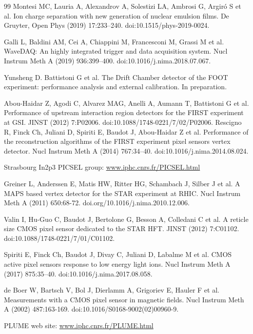 \documentclass[utf8]{frontiersFPHY} %
\begin{document}
\begin{thebibliography}{99}
 Montesi MC, Lauria A, Alexandrov A, Solestizi LA, Ambrosi G, Argir\'o S et al. Ion charge separation with new generation of nuclear emulsion films. De Gruyter, Open Phys (2019) 17:233–240. doi:10.1515/phys-2019-0024.

 Galli L, Baldini AM, Cei A, Chiappini M, Francesconi M, Grassi M et al. WaveDAQ: An highly integrated trigger and data acquisition system. Nucl Instrum Meth A (2019) 936:399–400. doi:10.1016/j.nima.2018.07.067.

 Yunsheng D. Battistoni G et al. The Drift Chamber detector of the FOOT experiment: performance analysis and external calibration. In preparation.

 Abou-Haidar Z, Agodi C, Alvarez MAG, Anelli A, Aumann T, Battistoni G et al. Performance of upstream interaction region detectors for the FIRST experiment at GSI. JINST (2012) 7:P02006. doi:10.1088/1748-0221/7/02/P02006.
 Rescigno R, Finck Ch, Juliani D, Spiriti E, Baudot J, Abou-Haidar Z et al. Performance of the reconstruction algorithms of the FIRST experiment pixel sensors vertex detector. Nucl Instrum Meth A (2014) 767:34–40. doi:10.1016/j.nima.2014.08.024.

 Strasbourg In2p3 PICSEL group: \url{www.iphc.cnrs.fr/PICSEL.html}

 Greiner L, Anderssen E, Matis HW, Ritter HG, Schambach J, Silber J et al. A MAPS based vertex detector for the STAR experiment at RHIC. Nucl Instrum Meth A (2011) 650:68-72. doi.org/10.1016/j.nima.2010.12.006.

 Valin I, Hu-Guo C, Baudot J, Bertolone G, Besson A, Colledani C et al. A reticle size CMOS pixel sensor dedicated to the STAR HFT. JINST (2012) 7:C01102. doi:10.1088/1748-0221/7/01/C01102.

 Spiriti E, Finck Ch, Baudot J, Divay C, Juliani D, Labalme M et al. CMOS active pixel sensors response to low energy light ions. Nucl Instrum Meth A (2017) 875:35–40. doi:10.1016/j.nima.2017.08.058.

 de Boer W, Bartsch V, Bol J, Dierlamm A, Grigoriev E, Hauler F et al. Measurements with a CMOS pixel sensor in magnetic fields. Nucl Instrum Meth A (2002) 487:163-169. doi:10.1016/S0168-9002(02)00960-9.

 PLUME web site: \url{www.iphc.cnrs.fr/PLUME.html}


\end{thebibliography}
\end{document}
